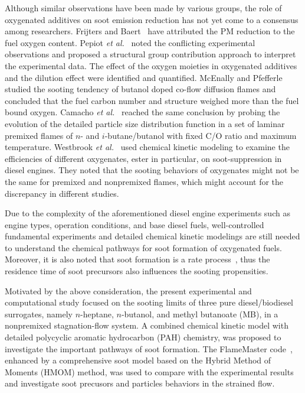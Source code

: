 \documentclass[preprint,3p,times,twocolumn]{elsarticleUS}
\begin{document}
Although similar observations have been made by various groups, the role of oxygenated additives on soot emission reduction has not yet come to a consensus among researchers. Frijters and Baert~\cite{frijters06} have attributed the PM reduction to the fuel oxygen content. Pepiot \emph{et al.}~\cite{desjardins08} noted the conflicting experimental observations and proposed a structural group contribution approach to interpret the experimental data. The effect of the oxygen moieties in oxygenated additives and the dilution effect were identified and quantified. McEnally and Pfefferle~\cite{mcenally05,mcenally11} studied the sooting tendency of butanol doped co-flow diffusion flames and concluded that the fuel carbon number and structure weighed more than the fuel bound oxygen. Camacho \emph{et al.}~\cite{camacho13} reached the same conclusion by probing the evolution of the detailed particle size distribution function in a set of laminar premixed flames of $n$- and $i$-butane/butanol with fixed C/O ratio and maximum temperature. Westbrook \emph{et al.}~\cite{westbrook06} used chemical kinetic modeling to examine the efficiencies of different oxygenates, ester in particular, on soot-suppression in diesel engines. They noted that the sooting behaviors of oxygenates might not be the same for premixed and nonpremixed flames, which might account for the discrepancy in different studies. 

Due to the complexity of the aforementioned diesel engine experiments such as engine types, operation conditions, and base diesel fuels, well-controlled fundamental experiments and detailed chemical kinetic modelings are still needed to understand the chemical pathways for soot formation of oxygenated fuels. Moreover, it is also noted that soot formation is a rate process~\cite{vandsburger85}, thus the residence time of soot precursors also influences the sooting propensities\cite{tsuji71}.

Motivated by the above consideration, the present experimental and computational study focused on the sooting limits of three pure diesel/biodiesel surrogates, namely $n$-heptane, $n$-butanol, and methyl butanoate (MB), in a nonpremixed stagnation-flow system. A combined chemical kinetic model with detailed polycyclic aromatic hydrocarbon (PAH) chemistry, was proposed to investigate the important pathways of soot formation. The FlameMaster code~\cite{flamemaster}, enhanced by a comprehensive soot model based on the Hybrid Method of Moments (HMOM) method, was used to compare with the experimental results and investigate soot precusors and particles behaviors in the strained flow. 
\end{document}
